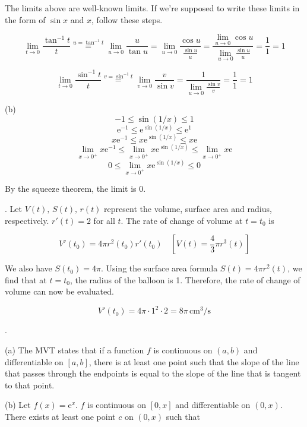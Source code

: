 \documentclass{article}
\begin{document}
\noindent The limits above are well-known limits. If we're supposed to write these limits in the form of $\sin x$ and $x$, follow these steps.

\[\lim_{t\to0}\frac{\tan^{-1} t}{t}\overset{u=\tan^{-1} t}{=}\lim_{u\to0}\frac u{\tan u} = \lim_{u\to0}\frac{\cos u}{\frac{\sin u}u}=\frac{\displaystyle \lim_{u\to0}\cos u}{\displaystyle\lim_{u\to0}\frac{\sin u}u} = \frac11 = 1\]

\[\lim_{t\to0}\frac{\sin^{-1} t}{t}\overset{v=\sin^{-1} t}{=}\lim_{v\to0}\frac v{\sin v} =\frac1{\displaystyle\lim_{u\to0}\frac{\sin v}v} = \frac11 = 1\]

\hfill

\noindent (b)
\[-1\leq\sin(1/x) \leq 1\]
\[\mathrm{e}^{-1}\leq\mathrm{e}^{\sin(1/x)} \leq \mathrm{e}^1\]
\[x\mathrm{e}^{-1}\leq x\mathrm{e}^{\sin(1/x)} \leq x\mathrm{e}\]
\[\lim_{x\to0^+}x\mathrm{e}^{-1}\leq \lim_{x\to0^+}x\mathrm{e}^{\sin(1/x)} \leq\lim_{x\to0^+}x\mathrm{e}\]
\[0\leq \lim_{x\to0^+}x\mathrm{e}^{\sin(1/x)} \leq0\]

\hfill

\noindent By the squeeze theorem, the limit is $\boxed{0}$.

\hfill

. Let $V(t),\,S(t),\,r(t)$ represent the volume, surface area and radius, respectively. $r'(t) = 2$ for all $t$. The rate of change of volume at $t=t_0$ is

\[V'(t_0) = 4\pi r^2(t_0)r'(t_0) \quad\left[V(t) = \frac43 \pi r^3(t)\right] \]

\hfill

\noindent We also have $S(t_0) = 4\pi$. Using the surface area formula $S(t) = 4\pi r^2(t)$, we find that at $t=t_0$, the radius of the balloon is 1. Therefore, the rate of change of volume can now be evaluated.

\[V'(t_0)=4\pi\cdot1^2\cdot2=\boxed{8\pi\,\text{cm}^3\text{/s}}\]

\newpage

.

\hfill

\noindent (a) The MVT states that if a function $f$ is continuous on $(a,b)$ and differentiable on $[a,b]$, there is at least one point such that the slope of the line that passes through the endpoints is equal to the slope of the line that is tangent to that point.

\hfill

\noindent (b) Let $f(x)=\mathrm{e}^x$. $f$ is continuous on $[0,x]$ and differentiable on $(0,x)$.  There exists at least one point $c$ on $(0,x)$ such that
\end{document}
